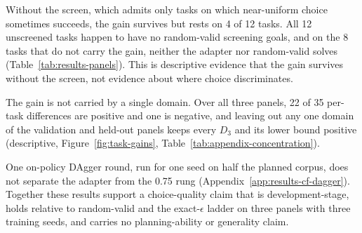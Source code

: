 Without the screen, which admits only tasks on which near-uniform choice sometimes succeeds, the gain survives but rests on 4 of 12 tasks. All 12 unscreened tasks happen to have no random-valid screening goals, and on the 8 tasks that do not carry the gain, neither the adapter nor random-valid solves (Table~\ref{tab:results-panels}). This is descriptive evidence that the gain survives without the screen, not evidence about where choice discriminates.

The gain is not carried by a single domain. Over all three panels, 22 of 35 per-task differences are positive and one is negative, and leaving out any one domain of the validation and held-out panels keeps every $D_3$ and its lower bound positive (descriptive, Figure~\ref{fig:task-gains}, Table~\ref{tab:appendix-concentration}).

One on-policy DAgger round, run for one seed on half the planned corpus, does not separate the adapter from the 0.75 rung (Appendix~\ref{app:results-cf-dagger}). Together these results support a choice-quality claim that is development-stage, holds relative to random-valid and the exact-$\epsilon$ ladder on three panels with three training seeds, and carries no planning-ability or generality claim.

